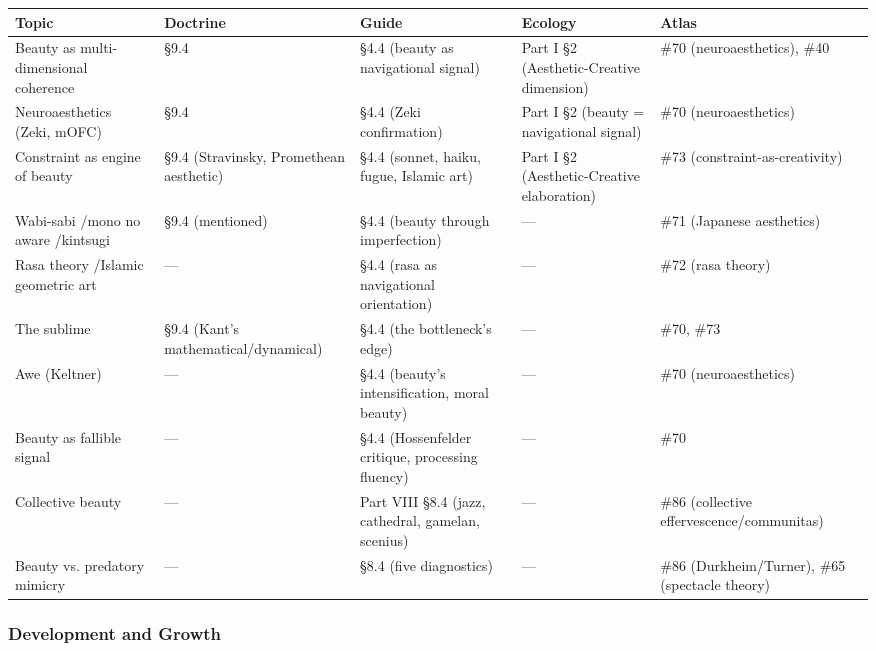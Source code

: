 {\small
\begin{longtable}{>{\raggedright\arraybackslash}p{} >{\raggedright\arraybackslash}p{} >{\raggedright\arraybackslash}p{} >{\raggedright\arraybackslash}p{} >{\raggedright\arraybackslash}p{}}
\toprule
\textbf{Topic} & \textbf{Doctrine} & \textbf{Guide} & \textbf{Ecology} & \textbf{Atlas} \\
\midrule
\endhead
Beauty as multi-dimensional coherence & §9.4 & §4.4 (beauty as navigational signal) & Part I §2 (Aesthetic-Creative dimension) & \#70 (neuroaesthetics), \#40 \\
Neuroaesthetics (Zeki, mOFC) & §9.4 & §4.4 (Zeki confirmation) & Part I §2 (beauty = navigational signal) & \#70 (neuroaesthetics) \\
Constraint as engine of beauty & §9.4 (Stravinsky, Promethean aesthetic) & §4.4 (sonnet, haiku, fugue, Islamic art) & Part I §2 (Aesthetic-Creative elaboration) & \#73 (constraint-as-creativity) \\
Wabi-sabi /\allowbreak  mono no aware /\allowbreak  kintsugi & §9.4 (mentioned) & §4.4 (beauty through imperfection) & — & \#71 (Japanese aesthetics) \\
Rasa theory /\allowbreak  Islamic geometric art & — & §4.4 (rasa as navigational orientation) & — & \#72 (rasa theory) \\
The sublime & §9.4 (Kant's mathematical/\allowbreak dynamical) & §4.4 (the bottleneck's edge) & — & \#70, \#73 \\
Awe (Keltner) & — & §4.4 (beauty's intensification, moral beauty) & — & \#70 (neuroaesthetics) \\
Beauty as fallible signal & — & §4.4 (Hossenfelder critique, processing fluency) & — & \#70 \\
Collective beauty & — & Part VIII §8.4 (jazz, cathedral, gamelan, scenius) & — & \#86 (collective effervescence/\allowbreak communitas) \\
Beauty vs. predatory mimicry & — & §8.4 (five diagnostics) & — & \#86 (Durkheim/\allowbreak Turner), \#65 (spectacle theory) \\
\bottomrule
\end{longtable}
}



\subsubsection*{Development and Growth}



